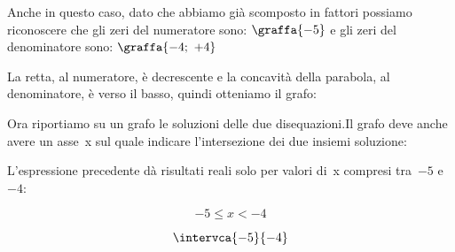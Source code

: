 \begin{esempio}
\begin{itemize}
\begin{minipage}{.49\textwidth}
Anche in questo caso, dato che abbiamo già scomposto in fattori possiamo 
riconoscere che gli zeri del numeratore sono:
\(\graffa{-5}\) 
e gli zeri del denominatore sono:
\(\graffa{-4;~+4}\) 

La retta, al numeratore, è decrescente e 
la concavità della parabola, al denominatore, è verso il basso, quindi 
otteniamo il grafo:
\end{minipage}
\hfill
\begin{minipage}{.49\textwidth}
\begin{center} \segnosistemabb \end{center}
\end{minipage}

\end{itemize}

\begin{minipage}{.49\textwidth}
Ora riportiamo su un grafo le soluzioni delle due disequazioni.Il grafo deve 
anche avere un asse~x sul quale indicare l'intersezione dei due insiemi 
soluzione:
\end{minipage}
\hfill
\begin{minipage}{.49\textwidth}
\begin{center} \sistemab \end{center}
\end{minipage}
L'espressione precedente dà risultati reali solo per valori di~x compresi 
tra~\(-5\) e \(-4\):

\begin{minipage}{.49 \linewidth}
\[-5 \le x < -4\]
\end{minipage}
\hfill
\begin{minipage}{.49 \linewidth}
\[\intervca{-5}{-4}\]
\end{minipage}

\end{esempio}
